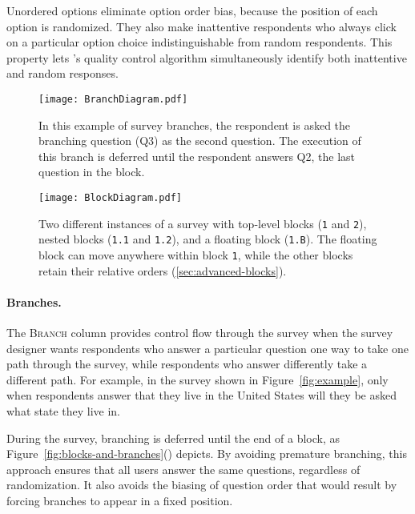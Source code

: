 Unordered options eliminate option order bias, because the
position of each option is randomized. They also make inattentive
respondents who always click on a particular option choice
indistinguishable from random respondents. This property lets
\surveyman{}'s quality control algorithm simultaneously identify both
inattentive and random responses.


\begin{figure*}[!t]
 \centering
 \begin{subfigure}[b]{0.3\textwidth}
                \texttt{[image: BranchDiagram.pdf]}
                \caption{In this example of survey branches, the respondent is asked the branching question (Q3) as the second question. The execution of this branch is deferred until the respondent answers Q2, the last question in the block.}
                \label{fig:branch-diagram}
        \end{subfigure}\quad\quad
 \begin{subfigure}[b]{0.3\textwidth}
                \texttt{[image: BlockDiagram.pdf]}
                \caption{Two different instances of a survey with top-level blocks (\texttt{1} and \texttt{2}), nested blocks (\texttt{1.1} and \texttt{1.2}), and a floating block (\texttt{1.B}). The floating block can move anywhere within block \texttt{1}, while the other blocks retain their relative orders (\ref{sec:advanced-blocks}).}
                \label{fig:block-diagram}
        \end{subfigure}\caption{Examples of branches and blocks.\label{fig:blocks-and-branches}}
\end{figure*}

\paragraph{Branches.}
The \textsc{Branch} column provides control flow through the survey
when the survey designer wants respondents who answer a particular
question one way to take one path through the survey, while
respondents who answer differently take a different path. 
For example, in the survey shown in Figure~\ref{fig:example}, only
when respondents answer that they live in the United States will they
be asked what state they live in.

During the survey, branching is deferred until the end of a block, as
Figure~\ref{fig:blocks-and-branches}() depicts. By avoiding premature branching, this
approach ensures that all users answer the same questions, regardless
of randomization. It also avoids the biasing of question order that
would result by forcing branches to appear in a fixed position.

